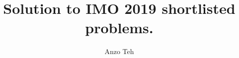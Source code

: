 \documentclass[11pt,a4paper]{article}
\begin{document}
\newcommand{\la}{\leftarrow}
\newcommand{\lra}{\leftrightarrow}
\newcommand{\bbN}{{\mathbb N}}
\newcommand{\bbZ}{{\mathbb Z}}
\newcommand{\bbQ}{{\mathbb Q}}
\newcommand{\bbR}{{\mathbb R}}
\newcommand{\bbC}{{\mathbb C}}
\newcommand{\bbH}{{\mathbb H}}
\newcommand{\dfeq}{\stackrel{\mathrm{def}}{=}}
\newcommand{\ra}{\rightarrow}
\newcommand{\Span}{\mathrm{span}}
\newcommand{\scrP}{\mathscr{P}}
\newcommand{\rank}{\mathrm{rank}}
\newcommand{\nullity}{\mathrm{nullity}}
\newcommand{\Col}{\mathrm{Col}}
\newcommand{\Row}{\mathrm{Row}}
\newcommand{\tr}{\mathrm{tr}}
\newcommand{\ol}{\overline}
\newcommand{\norm}[1]{||#1||}
\newcommand{\doubleline}[1]{\underline{\underline{#1}}}
\newcommand{\elemop}[1]{\stackrel{#1}{\longrightarrow}}
\newcommand{\Ind}{\mathrm{Ind}}
\newcommand{\Res}{\mathrm{Res}}
\newcommand{\End}{\mathrm{End}}
\newcommand{\cl}{\mathrm{cl}}
\newcommand{\code}[1]{\texttt{#1}}
\newcommand\tab[1][0.5cm]{\hspace*{#1}}
\newcommand{\<}{\langle}
\renewcommand{\>}{\rangle}
\newcommand{\qubits}[1]{|{#1}\rangle}
\newcommand{\powset}{\mathcal{P}}
\newcommand{\dsum}{\displaystyle\sum}
\newcommand{\dprod}{\displaystyle\prod}

\newtheorem{lemma}{Lemma}

\title{Solution to IMO 2019 shortlisted problems.}
\author{Anzo Teh}
\date{}
\maketitle
\end{document}
